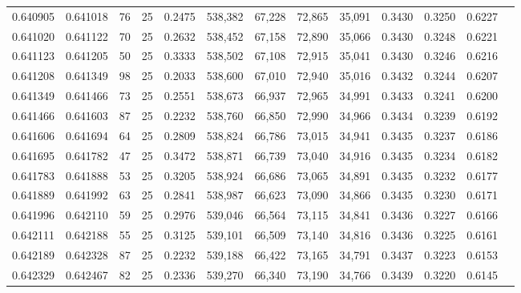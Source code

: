 \begin{tabular}{rrrrrrrrrrrrr}
0.640905 & 0.641018 &    76 &  25 &                                     0.2475 & 538,382 &  67,228 &  72,865 &  35,091 & 0.3430 & 0.3250 & 0.6227 \\
0.641020 & 0.641122 &    70 &  25 &                                     0.2632 & 538,452 &  67,158 &  72,890 &  35,066 & 0.3430 & 0.3248 & 0.6221 \\
0.641123 & 0.641205 &    50 &  25 &                                     0.3333 & 538,502 &  67,108 &  72,915 &  35,041 & 0.3430 & 0.3246 & 0.6216 \\
0.641208 & 0.641349 &    98 &  25 &                                     0.2033 & 538,600 &  67,010 &  72,940 &  35,016 & 0.3432 & 0.3244 & 0.6207 \\
0.641349 & 0.641466 &    73 &  25 &                                     0.2551 & 538,673 &  66,937 &  72,965 &  34,991 & 0.3433 & 0.3241 & 0.6200 \\
0.641466 & 0.641603 &    87 &  25 &                                     0.2232 & 538,760 &  66,850 &  72,990 &  34,966 & 0.3434 & 0.3239 & 0.6192 \\
0.641606 & 0.641694 &    64 &  25 &                                     0.2809 & 538,824 &  66,786 &  73,015 &  34,941 & 0.3435 & 0.3237 & 0.6186 \\
0.641695 & 0.641782 &    47 &  25 &                                     0.3472 & 538,871 &  66,739 &  73,040 &  34,916 & 0.3435 & 0.3234 & 0.6182 \\
0.641783 & 0.641888 &    53 &  25 &                                     0.3205 & 538,924 &  66,686 &  73,065 &  34,891 & 0.3435 & 0.3232 & 0.6177 \\
0.641889 & 0.641992 &    63 &  25 &                                     0.2841 & 538,987 &  66,623 &  73,090 &  34,866 & 0.3435 & 0.3230 & 0.6171 \\
0.641996 & 0.642110 &    59 &  25 &                                     0.2976 & 539,046 &  66,564 &  73,115 &  34,841 & 0.3436 & 0.3227 & 0.6166 \\
0.642111 & 0.642188 &    55 &  25 &                                     0.3125 & 539,101 &  66,509 &  73,140 &  34,816 & 0.3436 & 0.3225 & 0.6161 \\
0.642189 & 0.642328 &    87 &  25 &                                     0.2232 & 539,188 &  66,422 &  73,165 &  34,791 & 0.3437 & 0.3223 & 0.6153 \\
0.642329 & 0.642467 &    82 &  25 &                                     0.2336 & 539,270 &  66,340 &  73,190 &  34,766 & 0.3439 & 0.3220 & 0.6145 \\

\end{tabular}
